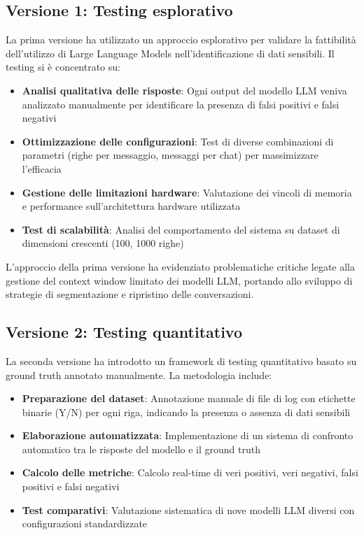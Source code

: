 \documentclass[12pt]{report}
\begin{document}
\subsection{Versione 1: Testing esplorativo}
\label{subsec:metodologia_v1}

La prima versione ha utilizzato un approccio esplorativo per validare la fattibilità dell'utilizzo di Large Language Models nell'identificazione di dati sensibili. Il testing si è concentrato su:

\begin{itemize}
    \item \textbf{Analisi qualitativa delle risposte}: Ogni output del modello LLM veniva analizzato manualmente per identificare la presenza di falsi positivi e falsi negativi
    \item \textbf{Ottimizzazione delle configurazioni}: Test di diverse combinazioni di parametri (righe per messaggio, messaggi per chat) per massimizzare l'efficacia
    \item \textbf{Gestione delle limitazioni hardware}: Valutazione dei vincoli di memoria e performance sull'architettura hardware utilizzata
    \item \textbf{Test di scalabilità}: Analisi del comportamento del sistema su dataset di dimensioni crescenti (100, 1000 righe)
\end{itemize}

L'approccio della prima versione ha evidenziato problematiche critiche legate alla gestione del context window limitato dei modelli LLM, portando allo sviluppo di strategie di segmentazione e ripristino delle conversazioni.

\subsection{Versione 2: Testing quantitativo}
\label{subsec:metodologia_v2}

La seconda versione ha introdotto un framework di testing quantitativo basato su ground truth annotato manualmente. La metodologia include:

\begin{itemize}
    \item \textbf{Preparazione del dataset}: Annotazione manuale di file di log con etichette binarie (Y/N) per ogni riga, indicando la presenza o assenza di dati sensibili
    \item \textbf{Elaborazione automatizzata}: Implementazione di un sistema di confronto automatico tra le risposte del modello e il ground truth
    \item \textbf{Calcolo delle metriche}: Calcolo real-time di veri positivi, veri negativi, falsi positivi e falsi negativi
    \item \textbf{Test comparativi}: Valutazione sistematica di nove modelli LLM diversi con configurazioni standardizzate
\end{itemize}
\end{document}
